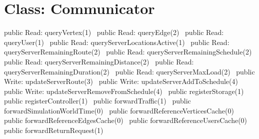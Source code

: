 \section*{Class: Communicator}
\nwenddocs{}\endmoddef{}
public \LA{}Read: queryVertex(1)~{\nwtagstyle{}}\RA{}
public \LA{}Read: queryEdge(2)~{\nwtagstyle{}}\RA{}
public \LA{}Read: queryUser(1)~{\nwtagstyle{}}\RA{}
public \LA{}Read: queryServerLocationsActive(1)~{\nwtagstyle{}}\RA{}
public \LA{}Read: queryServerRemainingRoute(2)~{\nwtagstyle{}}\RA{}
public \LA{}Read: queryServerRemainingSchedule(2)~{\nwtagstyle{}}\RA{}
public \LA{}Read: queryServerRemainingDistance(2)~{\nwtagstyle{}}\RA{}
public \LA{}Read: queryServerRemainingDuration(2)~{\nwtagstyle{}}\RA{}
public \LA{}Read: queryServerMaxLoad(2)~{\nwtagstyle{}}\RA{}
\nwendcode{}\nwdocspar
{}
\nwenddocs{}\plusendmoddef
public \LA{}Write: updateServerRoute(3)~{\nwtagstyle{}}\RA{}
public \LA{}Write: updateServerAddToSchedule(4)~{\nwtagstyle{}}\RA{}
public \LA{}Write: updateServerRemoveFromSchedule(4)~{\nwtagstyle{}}\RA{}
\nwendcode{}\nwdocspar
{}
\nwenddocs{}\plusendmoddef
public \LA{}registerStorage(1)~{\nwtagstyle{}}\RA{}
public \LA{}registerController(1)~{\nwtagstyle{}}\RA{}
public \LA{}forwardTraffic(1)~{\nwtagstyle{}}\RA{}
public \LA{}forwardSimulationWorldTime(0)~{\nwtagstyle{}}\RA{}
public \LA{}forwardReferenceVerticesCache(0)~{\nwtagstyle{}}\RA{}
public \LA{}forwardReferenceEdgesCache(0)~{\nwtagstyle{}}\RA{}
public \LA{}forwardReferenceUsersCache(0)~{\nwtagstyle{}}\RA{}
public \LA{}forwardReturnRequest(1)~{\nwtagstyle{}}\RA{}
\nwendcode{}\nwdocspar

